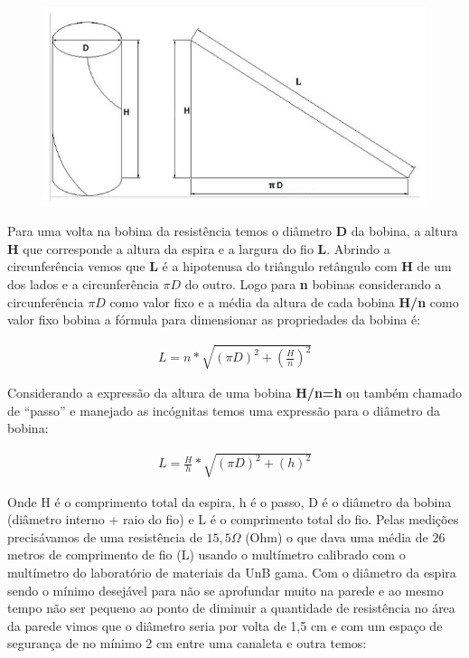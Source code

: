 \begin{figure}[!ht]
	\centering
	\label{areaforno}
	\includegraphics[keepaspectratio=true,scale=1.0]{figuras/alimentacao3.JPG}
\end{figure}

Para uma volta na bobina da resistência temos o diâmetro \textbf{D} da bobina, a altura \textbf{H} que corresponde a altura da espira e a largura do fio \textbf{L}. Abrindo a circunferência vemos que \textbf{L} é a hipotenusa do triângulo retângulo com \textbf{H} de um dos lados e a circunferência \textbf{$\pi D$} do outro.
Logo para \textbf{n} bobinas considerando a circunferência \textbf{$\pi D$} como valor fixo e a média da altura de cada bobina \textbf{H/n} como valor fixo bobina  a fórmula para dimensionar as propriedades da bobina é:

\begin{gather}
    L = n * \sqrt{(\pi D)^{2} + \left(\frac{H}{n}\right)^{2}}
\end{gather}

Considerando a expressão da altura de uma bobina \textbf{H/n=h} ou também chamado de “passo” e manejado as incógnitas temos uma expressão para o diâmetro da bobina:

\begin{gather}
    L = \frac{H}{h} * \sqrt{(\pi D)^{2} + \left(h\right)^{2}}
\end{gather}

Onde H é o comprimento total da espira, h é o passo, D é o diâmetro da bobina (diâmetro interno + raio do fio) e L é o comprimento total do fio.
Pelas medições precisávamos de uma resistência de $15,5\Omega$ (Ohm) o que dava uma média de 26 metros de comprimento de fio (L) usando o multímetro calibrado com o multímetro do laboratório de materiais da UnB gama.
Com o diâmetro da espira sendo o mínimo desejável para não se aprofundar muito na parede e ao mesmo tempo não ser pequeno ao ponto de diminuir a quantidade de resistência no área da parede vimos que o diâmetro seria por volta de 1,5 cm e com um espaço de segurança de no mínimo 2 cm entre uma canaleta e outra temos:

